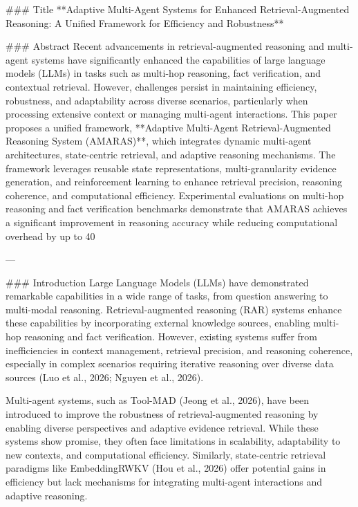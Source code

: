 ### Title
**Adaptive Multi-Agent Systems for Enhanced Retrieval-Augmented Reasoning: A Unified Framework for Efficiency and Robustness**

### Abstract
Recent advancements in retrieval-augmented reasoning and multi-agent systems have significantly enhanced the capabilities of large language models (LLMs) in tasks such as multi-hop reasoning, fact verification, and contextual retrieval. However, challenges persist in maintaining efficiency, robustness, and adaptability across diverse scenarios, particularly when processing extensive context or managing multi-agent interactions. This paper proposes a unified framework, **Adaptive Multi-Agent Retrieval-Augmented Reasoning System (AMARAS)**, which integrates dynamic multi-agent architectures, state-centric retrieval, and adaptive reasoning mechanisms. The framework leverages reusable state representations, multi-granularity evidence generation, and reinforcement learning to enhance retrieval precision, reasoning coherence, and computational efficiency. Experimental evaluations on multi-hop reasoning and fact verification benchmarks demonstrate that AMARAS achieves a significant improvement in reasoning accuracy while reducing computational overhead by up to 40%

---

### Introduction
Large Language Models (LLMs) have demonstrated remarkable capabilities in a wide range of tasks, from question answering to multi-modal reasoning. Retrieval-augmented reasoning (RAR) systems enhance these capabilities by incorporating external knowledge sources, enabling multi-hop reasoning and fact verification. However, existing systems suffer from inefficiencies in context management, retrieval precision, and reasoning coherence, especially in complex scenarios requiring iterative reasoning over diverse data sources (Luo et al., 2026; Nguyen et al., 2026).

Multi-agent systems, such as Tool-MAD (Jeong et al., 2026), have been introduced to improve the robustness of retrieval-augmented reasoning by enabling diverse perspectives and adaptive evidence retrieval. While these systems show promise, they often face limitations in scalability, adaptability to new contexts, and computational efficiency. Similarly, state-centric retrieval paradigms like EmbeddingRWKV (Hou et al., 2026) offer potential gains in efficiency but lack mechanisms for integrating multi-agent interactions and adaptive reasoning.

